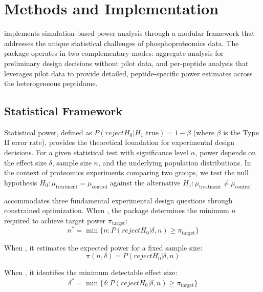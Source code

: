 \documentclass[article]{jss}
\begin{document}

\section{Methods and Implementation} \label{sec:methods}

 implements simulation-based power analysis through a modular framework that addresses the unique statistical challenges of phosphoproteomics data. The package operates in two complementary modes: aggregate analysis for preliminary design decisions without pilot data, and per-peptide analysis that leverages pilot data to provide detailed, peptide-specific power estimates across the heterogeneous peptidome.


\subsection{Statistical Framework}

Statistical power, defined as $P(reject H_0 | H_1 \text{ true}) = 1 - \beta$ (where $\beta$ is the Type II error rate), provides the theoretical foundation for experimental design decisions. For a given statistical test with significance level $\alpha$, power depends on the effect size $\delta$, sample size $n$, and the underlying population distributions. In the context of proteomics experiments comparing two groups, we test the null hypothesis $H_0: \mu_{\text{treatment}} = \mu_{\text{control}}$ against the alternative $H_1: \mu_{\text{treatment}} \neq \mu_{\text{control}}$.

 accommodates three fundamental experimental design questions through constrained optimization. When , the package determines the minimum $n$ required to achieve target power $\pi_{\text{target}}$:
\begin{equation}
n^* = \min\{n : P(reject H_0 | \delta, n) \geq \pi_{\text{target}}\}
\end{equation}

When , it estimates the expected power for a fixed sample size:
\begin{equation}
\pi(n, \delta) = P(reject H_0 | \delta, n)
\end{equation}

When , it identifies the minimum detectable effect size:
\begin{equation}
\delta^* = \min\{\delta : P(reject H_0 | \delta, n) \geq \pi_{\text{target}}\}
\end{equation}
\end{document}
